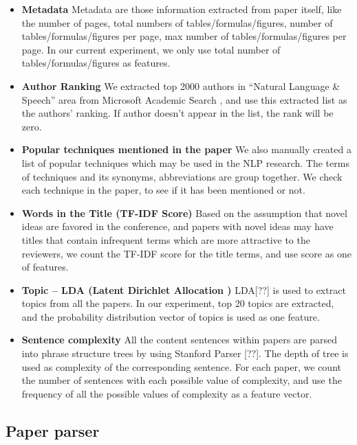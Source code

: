 \documentclass[11pt,letterpaper]{article}
\begin{document}
\begin{itemize} 
\item {\bf Metadata}
Metadata are those information extracted from paper itself, like the number of pages, total numbers of tables/formulas/figures, number of tables/formulas/figures per page, max number of tables/formulas/figures per page. In our current experiment, we only use total number of tables/formulas/figures as features.

\item {\bf 	Author Ranking}
We extracted top 2000 authors in ``Natural Language \& Speech'' area from Microsoft Academic Search , and use this extracted list as the authors' ranking. If author doesn't appear in the list, the rank will be zero.

\item {\bf 	Popular techniques mentioned in the paper}
We also manually created a list of popular techniques which may be used in the NLP research. The terms of techniques and its synonyms, abbreviations are group together. We check each technique in the paper, to see if it has been mentioned or not.

\item {\bf Words in the Title (TF-IDF Score)}
Based on the assumption that novel ideas are favored in the conference, and papers with novel ideas may have titles that contain infrequent terms which are more attractive to the reviewers, we count the TF-IDF score for the title terms, and use score as one of features.

\item {\bf Topic – LDA (Latent Dirichlet Allocation )}
LDA[??] is used to extract topics from all the papers. In our experiment, top 20 topics are extracted, and the probability distribution vector of topics is used as one feature. 

\item {\bf 	Sentence complexity}
All the content sentences within papers are parsed into phrase structure trees by using Stanford Parser [??]. The depth of tree is used as complexity of the corresponding sentence.  
For each paper, we count the number of sentences with each possible value of complexity,
and use the frequency of all the possible values of complexity as a feature vector.
\end{itemize}




\subsection{Paper parser}
\end{document}
